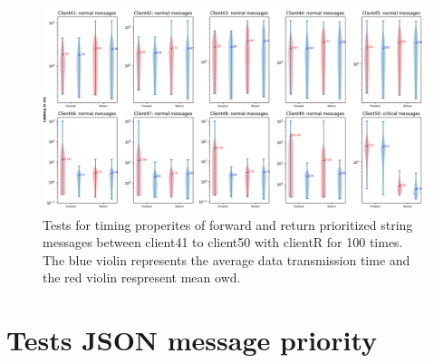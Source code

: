 \begin{figure}
    \includegraphics[width=\textheight]{figures/appendix/priority_tests/log_violin_50clients_string_figure_5.png}\hfill 
    \caption{Tests for timing properites of forward and return prioritized string messages between client41 to client50 
    with clientR for 100 times. The blue violin represents the average data transmission time and the red violin 
    respresent mean \gls{owd}.} \label{fig: priority-50clients-string-e}
\end{figure}


\newpage
\section{Tests JSON message priority}\label{chap: append-image-priority}


